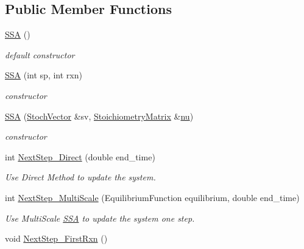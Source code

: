 \subsection*{Public Member Functions}
\begin{CompactItemize}
\item 
\hyperlink{class_s_s_a_7f54a44f351cc190c7977ee700842e1a}{SSA} ()
\begin{CompactList}\small\item\em default constructor \item\end{CompactList}\item 
\hyperlink{class_s_s_a_156000a79285be59dbbc3728e84b5249}{SSA} (int sp, int rxn)
\begin{CompactList}\small\item\em constructor \item\end{CompactList}\item 
\hyperlink{class_s_s_a_e4f48e01ecf12a1f2ea86b4af7d65556}{SSA} (\hyperlink{class_stoch_vector}{StochVector} \&sv, \hyperlink{class_stoichiometry_matrix}{StoichiometryMatrix} \&\hyperlink{class_base_system_d664dd55778f4e00a06cb3583b4c27e8}{nu})
\begin{CompactList}\small\item\em constructor \item\end{CompactList}\item 
int \hyperlink{class_s_s_a_b88174aca0c6742aa470cdcf74dfdb83}{NextStep\_\-Direct} (double end\_\-time)
\begin{CompactList}\small\item\em Use Direct Method to update the system. \item\end{CompactList}\item 
int \hyperlink{class_s_s_a_4b592f5a1a5f623fe5987a75ba860a35}{NextStep\_\-MultiScale} (EquilibriumFunction equilibrium, double end\_\-time)
\begin{CompactList}\small\item\em Use MultiScale \hyperlink{class_s_s_a}{SSA} to update the system one step. \item\end{CompactList}\item 
\hypertarget{class_s_s_a_041a3ffa72bc7b891c9c69318af91e0d}{
void \hyperlink{class_s_s_a_041a3ffa72bc7b891c9c69318af91e0d}{NextStep\_\-FirstRxn} ()}
\label{class_s_s_a_041a3ffa72bc7b891c9c69318af91e0d}


\end{CompactItemize}
